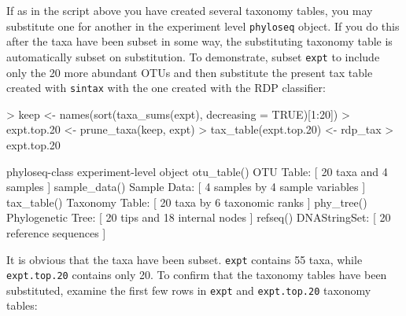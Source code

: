 \documentclass{article}
\begin{document}
If as in the script above you have created several taxonomy tables, you may substitute one for another in the experiment level \texttt{phyloseq} object. If you do this after the taxa have been subset in some way, the substituting taxonomy table is automatically subset on substitution. To demonstrate, subset \texttt{expt} to include only the 20 more abundant OTUs and then substitute the present tax table created with \texttt{sintax} with the one created with the RDP classifier:  

\begin{Schunk}
\begin{Sinput}
> keep <- names(sort(taxa_sums(expt), decreasing = TRUE)[1:20])
> expt.top.20 <- prune_taxa(keep, expt)
> tax_table(expt.top.20) <- rdp_tax
> expt.top.20
\end{Sinput}
\begin{Soutput}
phyloseq-class experiment-level object
otu_table()   OTU Table:         [ 20 taxa and 4 samples ]
sample_data() Sample Data:       [ 4 samples by 4 sample variables ]
tax_table()   Taxonomy Table:    [ 20 taxa by 6 taxonomic ranks ]
phy_tree()    Phylogenetic Tree: [ 20 tips and 18 internal nodes ]
refseq()      DNAStringSet:      [ 20 reference sequences ]
\end{Soutput}
\end{Schunk}

It is obvious that the taxa have been subset. \texttt{expt} contains 55 taxa, while \texttt{expt.top.20} contains only 20. To confirm that the taxonomy tables have been substituted, examine the first few rows in \texttt{expt} and \texttt{expt.top.20} taxonomy tables:  
\end{document}
